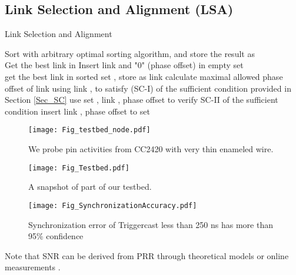 \documentclass[conference]{IEEEtran}
\begin{document}
\subsection{Link Selection and Alignment (LSA)}
\begin{algorithm}
\label{Alg_LSA}
\caption{Link Selection and Alignment} 
\SetAlgoNoLine  \LinesNumbered
{} 
\BlankLine
Sort  with arbitrary optimal sorting algorithm, and store the result as  \\
Get the best link  in Insert link  and "0" (phase offset) in empty set \\
\For{}
{{get the best link  in sorted set , store as link }\;
{calculate maximal allowed phase offset  of link  using link , to satisfy (SC-I) of the sufficient condition provided in Section \ref{Sec_SC}}\;
{use set , link , phase offset  to verify SC-II of the sufficient condition}\;
{{insert link , phase offset  to set }\;
}}
\end{algorithm}
\begin{figure*}[t]
  \centering
\begin{minipage}[b]{0.32\textwidth}
    \centering
    \texttt{[image: Fig\_testbed\_node.pdf]}
    \caption{We probe pin activities from CC2420 with very thin enameled wire.}
    \label{Fig_testbed_node}\end{minipage}\hspace{0.01\textwidth}\begin{minipage}[b]{0.32\textwidth}
    \centering
    \texttt{[image: Fig\_Testbed.pdf]}
    \caption{A snapshot of part of our testbed.}
    \label{Fig_Testbed}\end{minipage}\hspace{0.01\textwidth}\begin{minipage}[b]{0.32\textwidth}
    \centering
    \texttt{[image: Fig\_SynchronizationAccuracy.pdf]}
    \caption{Synchronization error of Triggercast less than 250 ns has more than 95\% confidence}
    \label{Fig_SynchronizationAccuracy}\end{minipage}\end{figure*}
\indent Note that SNR can be derived from PRR through theoretical models \cite{Yin2012SCIF} or online measurements \cite{Xing2010ICNPPassive}.
\end{document}
